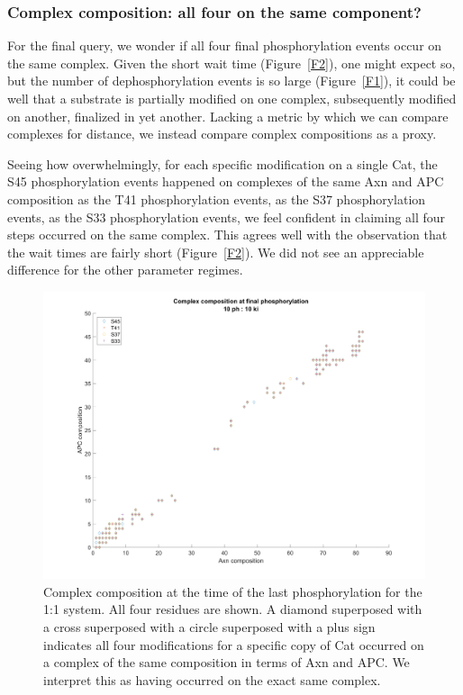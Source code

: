 \subsubsection{Complex composition: all four on the same component?}

For the final query, we wonder if all four final phosphorylation
events occur on the same complex. Given the short wait time
(Figure~\ref{F2}), one might expect so, but the number of
dephosphorylation events is so large (Figure~\ref{F1}), it could be
well that a substrate is partially modified on one complex,
subsequently modified on another, finalized in yet another. Lacking a
metric by which we can compare complexes for distance, we instead
compare complex compositions as a proxy.

Seeing how overwhelmingly, for each specific modification on a single Cat, the
S45 phosphorylation events happened on complexes of the same Axn and
APC composition as the T41 phosphorylation events, as the S37
phosphorylation events, as the S33 phosphorylation events, we feel
confident in claiming all four steps occurred on the same
complex. This agrees well with the observation that the wait times are
fairly short (Figure~\ref{F2}). We did not see an appreciable
difference for the other parameter regimes.

\begin{figure}[h]
  \centering
  \includegraphics[width=\columnwidth]{wnt/F11_complex_composition_10_10}
  \caption{Complex composition at the time of the last phosphorylation
    for the 1:1 system. All four residues are shown. A diamond
    superposed with a cross superposed with a circle superposed with a
    plus sign indicates all four modifications for a specific copy of
    Cat occurred on a complex of the same composition in terms of Axn
    and APC. We interpret this as having occurred on the exact same
    complex.}
  \label{F11}
\end{figure}